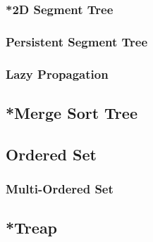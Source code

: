 \documentclass[letterpaper,landscape]{article}
\begin{document}


\subsubsection{*2D Segment Tree}

\subsubsection{Persistent Segment Tree}



\subsubsection{Lazy Propagation}



\subsection{*Merge Sort Tree}

\subsection{Ordered Set}



\subsubsection{Multi-Ordered Set}



\subsection{*Treap}
\end{document}
